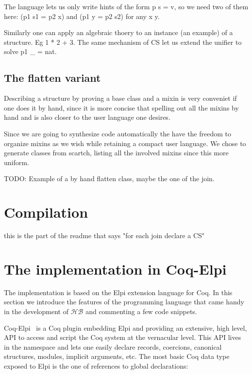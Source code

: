 \documentclass[a4paper,UKenglish,cleveref, autoref]{lipics-v2019}
\newcommand{\HB}{\ensuremath{\mathcal{HB}}}
\begin{document}
The language lets us only write hints of the form p s = v, so we need two
of them here: (p1 s1 = p2 x) and (p1 y = p2 s2) for any x y.

Similarly one can apply an algebraic thoery to an instance (an example)
of a structure. Eg 1 * 2 + 3. The same mechanism of CS let us
extend the unifier to solve p1 \_ = nat.

\subsection{The flatten variant}

Describing a structure by proving a base class and a mixin is very conveniet
if one does it by hand, since it is more concise that spelling out all the
mixins by hand and is also closer to the user language one desires.

Since we are going to synthesize code automatically the have the freedom
to organize mixins as we wish while retaining a compact user language.
We chose to generate classes from scartch, listing all the involved
mixins since this more uniform.

TODO: Example of a by hand flatten class, maybe the one of the join.

\section{Compilation}\label{sec:compilation}
this is the part of the readme that says "for each join declare a CS"


\section{The implementation in Coq-Elpi}\label{sec:implementation}

The implementation is based on the Elpi
extension language for Coq. In this section we introduce the features of the
programming language that came handy in the development of \HB{} and
commenting a few code snippets.

Coq-Elpi~\cite{CoqElpi} is a Coq plugin embedding
Elpi and providing an
extensive, high level, API to access and script the Coq system at the
vernacular level.
This API lives in the  namespace and lets one easily declare
records, coercions, canonical structures, modules, implicit arguments, etc.
The most basic Coq data type exposed to Elpi is the one of references to global
declarations:
\end{document}
